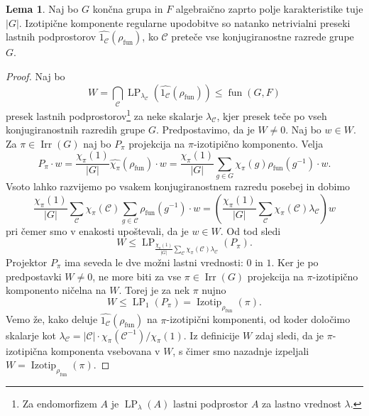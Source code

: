 \documentclass[11pt]{book}
\def\conclass{\mathcal{C}}
\DeclareMathOperator\Izotip{Izotip}
\DeclareMathOperator\Irr{Irr}
\DeclareMathOperator\Eigenspace{LP}
\DeclareMathOperator\fun{fun}
\theoremstyle{definition}
\theoremstyle{zgled}
\theoremstyle{zgledbrezstevilke}
\theoremstyle{odprtproblem}
\theoremstyle{domacanaloga}
\newenvironment{dokaz}
    {\color{siva}\begin{proof}}
    {\end{proof}}
\theoremstyle{izrek}
\newtheorem{lema}[theorem]{Lema}
\begin{document}
\begin{lema}
Naj bo $G$ končna grupa in $F$ algebraično zaprto polje karakteristike tuje $|G|$. Izotipične komponente regularne upodobitve so natanko netrivialni preseki lastnih podprostorov $\widehat{1_{\conclass}}(\rho_{\fun})$, ko $\conclass$ preteče vse konjugiranostne razrede grupe $G$.
\end{lema}
\begin{dokaz}
Naj bo
\[
    \textstyle W = \bigcap_{\conclass} \Eigenspace_{\lambda_{\conclass}}\left(\widehat{1_{\conclass}}(\rho_{\fun})\right) \leq \fun(G,F)
\]
presek lastnih podprostorov\footnote{Za endomorfizem $A$ je $\Eigenspace_\lambda(A)$ lastni podprostor $A$ za lastno vrednost $\lambda$.} za neke skalarje $\lambda_{\conclass}$, kjer presek teče po vseh konjugiranostnih razredih grupe $G$. Predpostavimo, da je $W \neq 0$. Naj bo $w \in W$. Za $\pi \in \Irr(G)$ naj bo $P_{\pi}$ projekcija na $\pi$-izotipično komponento. Velja
\[
    P_{\pi} \cdot w = \frac{\chi_{\pi}(1)}{|G|} \widehat{\chi_{\pi}}(\rho_{\fun}) \cdot w =
    \frac{\chi_{\pi}(1)}{|G|} \sum_{g \in G} \chi_{\pi}(g) \rho_{\fun}(g^{-1}) \cdot w.
\]
Vsoto lahko razvijemo po vsakem konjugiranostnem razredu posebej in dobimo
\[
    \frac{\chi_{\pi}(1)}{|G|} \sum_{\conclass} \chi_{\pi}(\conclass) \sum_{g \in \conclass} \rho_{\fun}(g^{-1}) \cdot w =
    \left( \frac{\chi_{\pi}(1)}{|G|} \sum_{\conclass} \chi_{\pi}(\conclass) \lambda_{\conclass} \right) w
\]
pri čemer smo v enakosti upoštevali, da je $w \in W$. Od tod sledi
\[
    \textstyle W \leq \Eigenspace_{\frac{\chi_{\pi}(1)}{|G|} \sum_{\conclass} \chi_{\pi}(\conclass) \lambda_{\conclass}}(P_{\pi}).
\]
Projektor $P_{\pi}$ ima seveda le dve možni lastni vrednosti: $0$ in $1$. Ker je po predpostavki $W \neq 0$, ne more biti za vse $\pi \in \Irr(G)$ projekcija na $\pi$-izotipično komponento ničelna na $W$. Torej je za nek $\pi$ nujno
\[
    \textstyle W \leq \Eigenspace_{1}(P_{\pi}) = \Izotip_{\rho_{\fun}}(\pi).
\]
Vemo že, kako deluje $\widehat{1_{\conclass}}(\rho_{\fun})$ na $\pi$-izotipični komponenti, od koder določimo skalarje kot $\lambda_{\conclass} = |\conclass| \cdot \chi_{\pi}(\conclass^{-1})/\chi_{\pi}(1)$. Iz definicije $W$ zdaj sledi, da je $\pi$-izotipična komponenta vsebovana v $W$, s čimer smo nazadnje izpeljali $W = \Izotip_{\rho_{\fun}}(\pi)$.
\end{dokaz}
\end{document}
